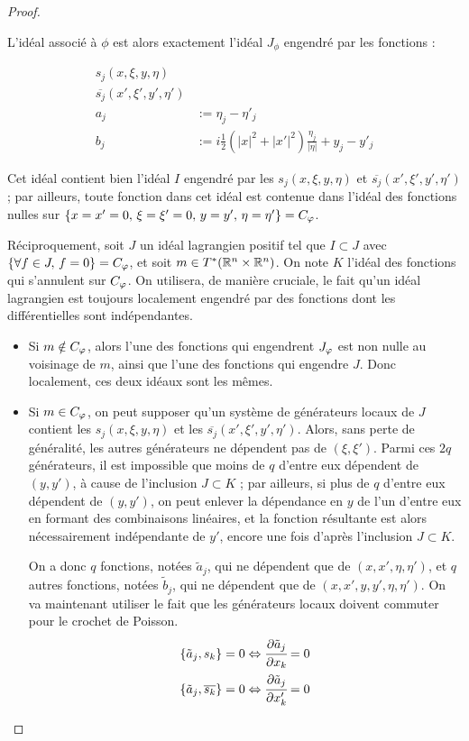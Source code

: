 \begin{proof}
\begin{enumerate}
  L'idéal associé à $\phi$ est alors exactement l'idéal $J_{\phi}$ engendré par les fonctions :
  
  \begin{align*}
    s_j(x,\xi,y,\eta)&\\
    \overline{s_j}(x',\xi',y',\eta')&\\
    a_j &:= \eta_j - \eta'_j\\
    b_j &:= i \frac 12 (|x|^2 + |x'|^2)\frac{\eta_j}{|\eta|} + y_j-y'_j
  \end{align*}
  
  Cet idéal contient bien l'idéal $I$ engendré par les $s_j(x,\xi,y,\eta)$ et $\overline{s_j}(x',\xi',y',\eta')$ ; par ailleurs, toute fonction dans cet idéal est con\-tenue dans l'idéal des fonctions nulles sur  $\{x=x'=0,\,\xi=\xi'=0,\,y=y',\,\eta=\eta'\}=C_{\varphi}$.
  
Réciproquement, soit $J$ un idéal lagrangien positif tel que $I
\subset J$ avec $\{\forall f \in J,\,f=0\}=C_{\varphi}$, et soit $m \in
T^*(\mathbb{R}^n \times \mathbb{R}^n)$. On note $K$ l'idéal des fonctions qui
s'annulent sur $C_{\varphi}$. On utilisera, de manière cruciale, le fait
qu'un idéal lagrangien est toujours localement engendré par des
fonctions dont les différentielles sont indépendantes.

\begin{itemize}
  \item Si $m \notin C_{\varphi}$, alors l'une des fonctions qui engendrent $J_{\varphi}$ est non nulle au voisinage de $m$, ainsi que l'une des fonctions qui engendre $J$. Donc localement, ces deux idéaux sont les mêmes.
  
  \item Si $m\in C_{\varphi}$, on peut supposer qu'un système de générateurs locaux de $J$ contient les $s_j(x,\xi,y,\eta)$ et les $\overline{s_j}(x',\xi',y',\eta')$. Alors, sans perte de généralité, les autres générateurs ne dépendent pas de $(\xi,\xi')$. Parmi ces $2q$ générateurs, il est impossible que moins de $q$ d'entre eux dépendent de $(y,y')$, à cause de l'inclusion $J \subset K$ ; par ailleurs, si plus de $q$ d'entre eux dépendent de $(y,y')$, on peut enlever la dépendance en $y$ de l'un d'entre eux en formant des combinaisons linéaires, et la fonction résultante est alors nécessairement indépendante de $y'$, encore une fois d'après l'inclusion $J \subset K$.

On a donc $q$ fonctions, notées $\tilde{a}_j$, qui ne dépendent que de $(x,x',\eta,\eta')$, et $q$ autres fonctions, notées $\tilde{b}_j$, qui ne dépendent que de $(x,x',y,y',\eta,\eta')$. On va maintenant utiliser le fait que les générateurs locaux doivent commuter pour le crochet de Poisson.
\begin{align*}
  \{\tilde{a}_j,s_k\}=0 \Leftrightarrow \cfrac{\partial \tilde{a}_j}{\partial x_k} =0\\
   \{\tilde{a}_j,\overline{s_k}\}=0 \Leftrightarrow \cfrac{\partial \tilde{a}_j}{\partial x'_k} =0
\end{align*}


\end{itemize}
\end{enumerate}
\end{proof}
